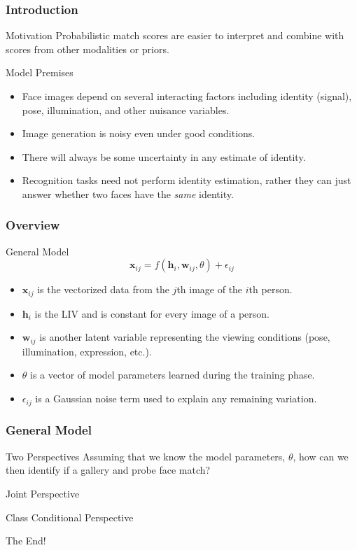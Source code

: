\documentclass{beamer}
\begin{document}
\begin{frame}
\frametitle{Introduction}
\begin{block}{Motivation}
Probabilistic match scores are easier to interpret and combine with scores from other modalities or priors.
\end{block}
\pause
\begin{block}{Model Premises}
\begin{itemize}
\item Face images depend on several interacting factors including identity (signal), pose, illumination, and other nuisance variables.
\pause
\item Image generation is noisy even under good conditions.
\pause
\item There will always be some uncertainty in any estimate of identity.
\pause
\item Recognition tasks need not perform identity estimation, rather they can just answer whether two faces have the \emph{same} identity.
\end{itemize}
\end{block}
\end{frame}

\begin{frame}
\frametitle{Overview}
\begin{block}{General Model}
\begin{equation}
\mathbf{x}_{ij} = f(\mathbf{h}_i, \mathbf{w}_{ij}, \theta) + \epsilon_{ij}
\end{equation}
\pause
\begin{itemize}
\item $\mathbf{x}_{ij}$ is the vectorized data from the $j$th image of the $i$th person.
\pause
\item $\mathbf{h}_i$ is the LIV and is constant for every image of a person.
\pause
\item $\mathbf{w}_{ij}$ is another latent variable representing the viewing conditions (pose, illumination, expression, etc.).
\pause
\item $\theta$ is a vector of model parameters learned during the training phase.
\pause
\item $\epsilon_{ij}$ is a Gaussian noise term used to explain any remaining variation.
\end{itemize}
\end{block}
\end{frame}

\begin{frame}
\frametitle{General Model}
\begin{block}{Two Perspectives}
Assuming that we know the model parameters, $\theta$, how can we then identify if a gallery and probe face match?
\end{block}
\begin{block}{Joint Perspective}

\end{block}
\begin{block}{Class Conditional Perspective}

\end{block}
\end{frame}

\begin{frame}
\centerline{The End!}
\end{frame}

\end{document}

